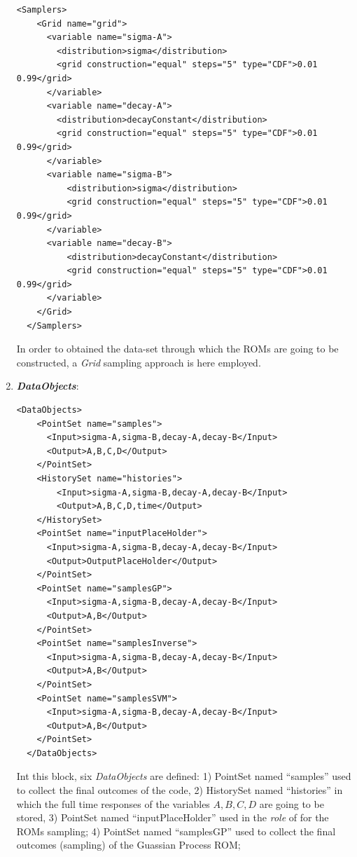\begin{enumerate}
\begin{lstlisting}[style=XML,morekeywords={arg,extension,pauseAtEnd,overwrite}]
  <Samplers>
    <Grid name="grid">
      <variable name="sigma-A">
        <distribution>sigma</distribution>
        <grid construction="equal" steps="5" type="CDF">0.01 0.99</grid>
      </variable>
      <variable name="decay-A">
        <distribution>decayConstant</distribution>
        <grid construction="equal" steps="5" type="CDF">0.01 0.99</grid>
      </variable>
      <variable name="sigma-B">
          <distribution>sigma</distribution>
          <grid construction="equal" steps="5" type="CDF">0.01 0.99</grid>
      </variable>
      <variable name="decay-B">
          <distribution>decayConstant</distribution>
          <grid construction="equal" steps="5" type="CDF">0.01 0.99</grid>
      </variable>
    </Grid>
  </Samplers>
\end{lstlisting}
  In order to obtained the data-set through which the ROMs are going to be
  constructed, a \textit{Grid} sampling approach is here employed.
   \item \textbf{\textit{DataObjects}}:
\begin{lstlisting}[style=XML,morekeywords={arg,extension,pauseAtEnd,overwrite}]
  <DataObjects>
    <PointSet name="samples">
      <Input>sigma-A,sigma-B,decay-A,decay-B</Input>
      <Output>A,B,C,D</Output>
    </PointSet>
    <HistorySet name="histories">
        <Input>sigma-A,sigma-B,decay-A,decay-B</Input>
        <Output>A,B,C,D,time</Output>
    </HistorySet>
    <PointSet name="inputPlaceHolder">
      <Input>sigma-A,sigma-B,decay-A,decay-B</Input>
      <Output>OutputPlaceHolder</Output>
    </PointSet> 
    <PointSet name="samplesGP">
      <Input>sigma-A,sigma-B,decay-A,decay-B</Input>
      <Output>A,B</Output>
    </PointSet>
    <PointSet name="samplesInverse">
      <Input>sigma-A,sigma-B,decay-A,decay-B</Input>
      <Output>A,B</Output>
    </PointSet>
    <PointSet name="samplesSVM">
      <Input>sigma-A,sigma-B,decay-A,decay-B</Input>
      <Output>A,B</Output>
    </PointSet>
  </DataObjects>
\end{lstlisting}
  Int this block, six \textit{DataObjects} are defined: 1) PointSet 
  named ``samples'' used to collect the final outcomes of the code, 2) 
  HistorySet named ``histories'' in which the full time responses of the 
  variables $A,B,C,D$ are going to be stored, 3) PointSet named    
  ``inputPlaceHolder'' used in the \textit{role} of  for the ROMs sampling;
  4) PointSet named ``samplesGP'' used to collect the final outcomes (sampling) of the Guassian Process ROM;

\end{enumerate}
